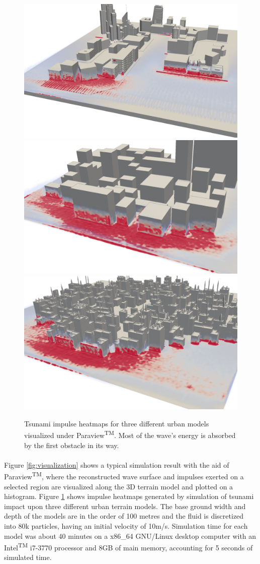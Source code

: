 \documentclass{llncs}
\begin{document}
\begin{figure}[h!]
  \includegraphics[width=.33\textwidth]{figures/impulse-heatmap-0.png}
  \includegraphics[width=.32\textwidth]{figures/impulse-heatmap-1.png}
  \includegraphics[width=.33\textwidth]{figures/impulse-heatmap-2.png}
  \caption{Tsunami impulse heatmaps for three different urban models visualized under
    Paraview\textsuperscript{TM}. Most of the wave's energy is absorbed by the first
    obstacle in its way.}
  \label{fig:impulse-heatmaps}
\end{figure}

\paragraph{} Figure \ref{fig:visualization} shows a typical simulation result with the aid
of Paraview\textsuperscript{TM}, where the reconstructed wave surface and impulses exerted
on a selected region are visualized along the 3D terrain model and plotted on a
histogram. Figure \ref{fig:impulse-heatmaps} shows impulse heatmaps generated by
simulation of tsunami impact upon three different urban terrain models. The base ground
width and depth of the models are in the order of 100 metres and the fluid is discretized
into 80k particles, having an initial velocity of 10m/s. Simulation time for each model
was about 40 minutes on a x86\_64 GNU/Linux desktop computer with an
Intel\textsuperscript{TM} i7-3770 processor and 8GB of main memory, accounting for 5
seconds of simulated time.
\end{document}

